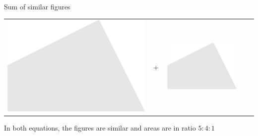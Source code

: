 \documentclass[14pt]{beamer}
\begin{document}
\begin{frame}{Sum of similar figures}
\begin{center}
{\begin{tabular}{ccccc}
                \includegraphics[scale=0.35]{figures/figure025e.pdf} & $\!+\!$ &
                \includegraphics[scale=0.35]{figures/figure025f.pdf}\\
            \end{tabular}}

            \bigskip\bigskip

            {\footnotesize In both equations, the figures are similar and areas are in ratio $5:4:1$}
        \end{center}
    \end{frame}

\end{document}

